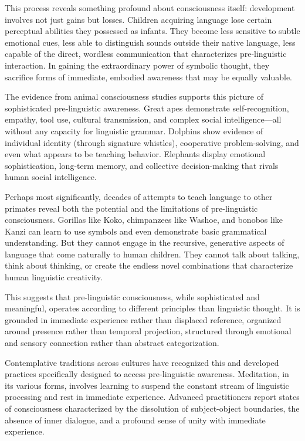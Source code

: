 This process reveals something profound about consciousness itself: development involves not just gains but losses. Children acquiring language lose certain perceptual abilities they possessed as infants. They become less sensitive to subtle emotional cues, less able to distinguish sounds outside their native language, less capable of the direct, wordless communication that characterizes pre-linguistic interaction. In gaining the extraordinary power of symbolic thought, they sacrifice forms of immediate, embodied awareness that may be equally valuable.

The evidence from animal consciousness studies supports this picture of sophisticated pre-linguistic awareness. Great apes demonstrate self-recognition, empathy, tool use, cultural transmission, and complex social intelligence—all without any capacity for linguistic grammar. Dolphins show evidence of individual identity (through signature whistles), cooperative problem-solving, and even what appears to be teaching behavior. Elephants display emotional sophistication, long-term memory, and collective decision-making that rivals human social intelligence.

Perhaps most significantly, decades of attempts to teach language to other primates reveal both the potential and the limitations of pre-linguistic consciousness. Gorillas like Koko, chimpanzees like Washoe, and bonobos like Kanzi can learn to use symbols and even demonstrate basic grammatical understanding. But they cannot engage in the recursive, generative aspects of language that come naturally to human children. They cannot talk about talking, think about thinking, or create the endless novel combinations that characterize human linguistic creativity.

This suggests that pre-linguistic consciousness, while sophisticated and meaningful, operates according to different principles than linguistic thought. It is grounded in immediate experience rather than displaced reference, organized around presence rather than temporal projection, structured through emotional and sensory connection rather than abstract categorization.

Contemplative traditions across cultures have recognized this and developed practices specifically designed to access pre-linguistic awareness. Meditation, in its various forms, involves learning to suspend the constant stream of linguistic processing and rest in immediate experience. Advanced practitioners report states of consciousness characterized by the dissolution of subject-object boundaries, the absence of inner dialogue, and a profound sense of unity with immediate experience.


